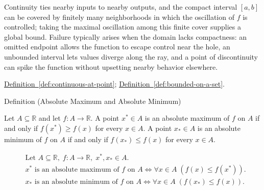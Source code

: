 \begin{remark*}[Interpretation]
Continuity ties nearby inputs to nearby outputs, and the compact interval $[a,b]$ can be covered by finitely many neighborhoods in which the oscillation of $f$ is controlled; taking the maximal oscillation among this finite cover supplies a global bound. Failure typically arises when the domain lacks compactness: an omitted endpoint allows the function to escape control near the hole, an unbounded interval lets values diverge along the ray, and a point of discontinuity can spike the function without upsetting nearby behavior elsewhere.
\end{remark*}

\begin{dependencies}
\hyperref[def:continuous-at-point]{Definition~\ref*{def:continuous-at-point}}; \hyperref[def:bounded-on-a-set]{Definition~\ref*{def:bounded-on-a-set}}.
\end{dependencies}


\begin{definitionbox}{Definition (Absolute Maximum and Absolute Minimum)}
\begin{definition}
\label{def:absolute-extrema}
Let $A \subseteq \mathbb{R}$ and let $f \colon A \to \mathbb{R}$. A point $x^{*} \in A$ is an absolute maximum of $f$ on $A$ if and only if $f(x^{*}) \ge f(x)$ for every $x \in A$. A point $x_{*} \in A$ is an absolute minimum of $f$ on $A$ if and only if $f(x_{*}) \le f(x)$ for every $x \in A$.
\end{definition}
\end{definitionbox}

\begin{remark*}
\[
\begin{aligned}
&\text{Let } A \subseteq \mathbb{R},\; f \colon A \to \mathbb{R},\; x^{*}, x_{*} \in A.\\
&x^{*} \text{ is an absolute maximum of } f \text{ on } A
\Longleftrightarrow \forall x \in A\; (f(x) \le f(x^{*})).\\
&x_{*} \text{ is an absolute minimum of } f \text{ on } A
\Longleftrightarrow \forall x \in A\; (f(x_{*}) \le f(x)).
\end{aligned}
\]
\end{remark*}

